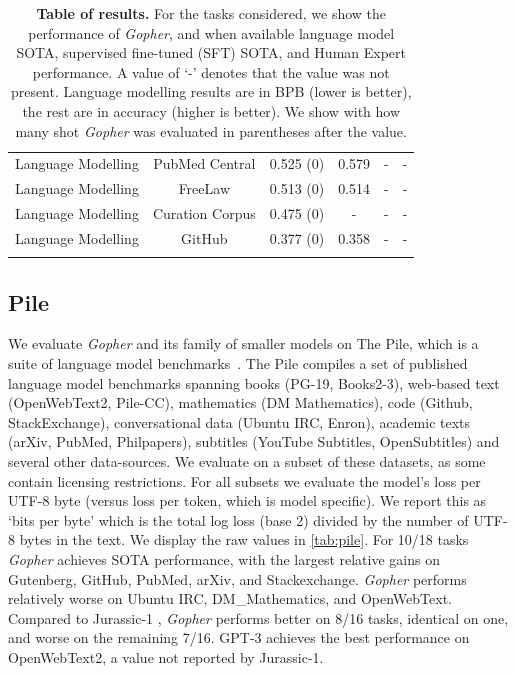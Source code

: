 \documentclass[11pt, a4paper, logo, internal, copyright, nonumbering]{deepmind}
\newcommand{\gopher}{\textit{Gopher}\xspace}
\begin{document}
\begin{center}
\begin{longtable}{cclccc}
Language Modelling & PubMed Central    &  0.525 (0) &  0.579 &  - & - \\
Language Modelling & FreeLaw           &  0.513 (0) &  0.514 &  - & - \\
Language Modelling & Curation Corpus   &  0.475 (0) &  - &  - & - \\
Language Modelling & GitHub            &  0.377 (0) &  0.358 &  - & -  \\
\bottomrule
\caption{\textbf{Table of results.} For the tasks considered, we show the performance of \gopher, and when available language model SOTA, supervised fine-tuned  (SFT) SOTA, and Human Expert performance. A value of `-' denotes that the value was not present. Language modelling results are in BPB  (lower is better), the rest are in accuracy  (higher is better). We show with how many shot \gopher was evaluated in parentheses after the value.
}
\label{tab:all_results}
\end{longtable}
\end{center}

\subsection{Pile}
\label{sec:pile}
We evaluate \gopher and its family of smaller models on The Pile, which is a suite of language model benchmarks~\citep{pile}. The Pile compiles a set of published language model benchmarks spanning books (PG-19, Books2-3), web-based text (OpenWebText2, Pile-CC), mathematics (DM Mathematics), code (Github, StackExchange), conversational data (Ubuntu IRC, Enron), academic texts (arXiv, PubMed, Philpapers), subtitles (YouTube Subtitles, OpenSubtitles) and several other data-sources. We evaluate on a subset of these datasets, as some contain licensing restrictions. For all subsets we evaluate the model's loss per UTF-8 byte (versus loss per token, which is model specific). We report this as `bits per byte' which is the total log loss (base 2) divided by the number of UTF-8 bytes in the text.
We display the raw values in \autoref{tab:pile}.
For 10/18 tasks \gopher achieves SOTA performance, with the largest relative gains on Gutenberg, GitHub, PubMed, arXiv, and Stackexchange.
\gopher performs relatively worse on Ubuntu IRC, DM\_Mathematics, and OpenWebText. 
Compared to Jurassic-1 \citep{jurassic}, \gopher performs better on 8/16 tasks, identical on one, and worse on the remaining 7/16. GPT-3 achieves the best performance on OpenWebText2, a value not reported by Jurassic-1. 
\end{document}
